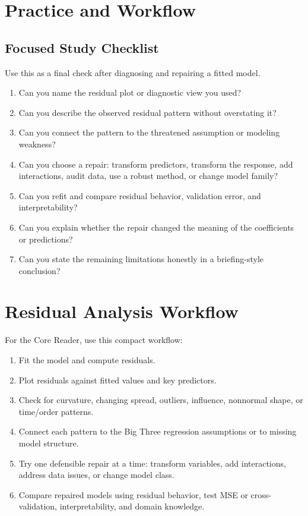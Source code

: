 {\section{Practice and Workflow}
\subsection*{Focused Study Checklist}

Use this as a final check after diagnosing and repairing a fitted model.

\begin{enumerate}
  \item Can you name the residual plot or diagnostic view you used?
  \item Can you describe the observed residual pattern without overstating it?
  \item Can you connect the pattern to the threatened assumption or modeling weakness?
  \item Can you choose a repair: transform predictors, transform the response, add interactions, audit data, use a robust method, or change model family?
  \item Can you refit and compare residual behavior, validation error, and interpretability?
  \item Can you explain whether the repair changed the meaning of the coefficients or predictions?
  \item Can you state the remaining limitations honestly in a briefing-style conclusion?
\end{enumerate}
}{
\section{Residual Analysis Workflow}

For the Core Reader, use this compact workflow:
\begin{enumerate}
  \item Fit the model and compute residuals.
  \item Plot residuals against fitted values and key predictors.
  \item Check for curvature, changing spread, outliers, influence, nonnormal shape, or time/order patterns.
  \item Connect each pattern to the Big Three regression assumptions or to missing model structure.
  \item Try one defensible repair at a time: transform variables, add interactions, address data issues, or change model class.
  \item Compare repaired models using residual behavior, test MSE or cross-validation, interpretability, and domain knowledge.
\end{enumerate}

}
